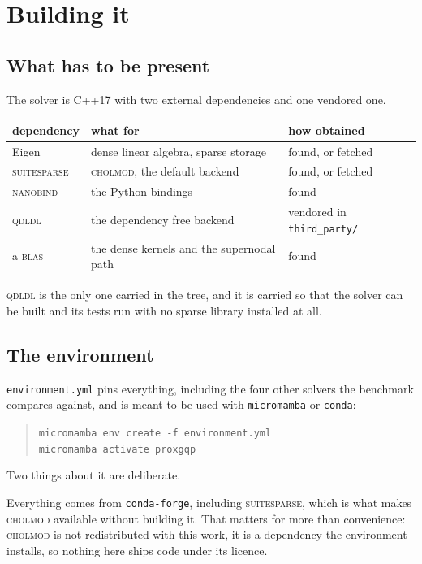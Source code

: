\documentclass[a4paper,11pt]{book}
\theoremstyle{plain}
\theoremstyle{definition}
\theoremstyle{remark}
\numberwithin{equation}{chapter}
\numberwithin{algorithm}{chapter}
\begin{document}
	\chapter{Building it}

	\section{What has to be present}

	The solver is C++17 with two external dependencies and one vendored one.

	\begin{table}[H]
		\centering\small
		\begin{tabular}{lll}
			\toprule
			dependency & what for & how obtained\\
			\midrule
			Eigen & dense linear algebra, sparse storage & found, or fetched\\
			\textsc{suitesparse} & \textsc{cholmod}, the default backend & found,
			or fetched\\
			\textsc{nanobind} & the Python bindings & found\\
			\textsc{qdldl} & the dependency free backend &
			vendored in \texttt{third\_party/}\\
			a \textsc{blas} & the dense kernels and the supernodal path & found\\
			\bottomrule
		\end{tabular}
	\end{table}

	\textsc{qdldl} is the only one carried in the tree, and it is carried so that
	the solver can be built and its tests run with no sparse library installed at
	all. 
	\section{The environment}

	\texttt{environment.yml} pins everything, including the four other solvers the
	benchmark compares against, and is meant to be used with
	\texttt{micromamba} or \texttt{conda}:

	\begin{quote}
		\texttt{micromamba env create -f environment.yml}\\
		\texttt{micromamba activate proxgqp}
	\end{quote}

	Two things about it are deliberate.

	Everything comes from \texttt{conda-forge}, including
	\textsc{suitesparse}, which is what makes \textsc{cholmod} available without
	building it. That matters for more than convenience: \textsc{cholmod} is not
	redistributed with this work, it is a dependency the environment installs, so
	nothing here ships code under its licence.
\end{document}
